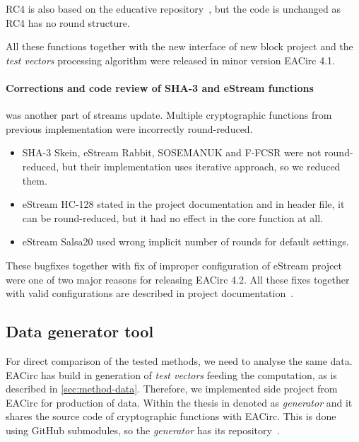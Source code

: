 \documentclass[
    digital,    %
    oneside,    %
    color,
    11pt,
    nocover,
    notable,
    nolof,
    nolot,
]{fithesis3}
\begin{document}
RC4 is also based on the educative repository~\cite{cryptoFunc}, but the code is unchanged as RC4 has no round structure.

All these functions together with the new interface of new block project and the \textit{test vectors} processing algorithm were released in minor version EACirc 4.1.

\paragraph{Corrections and code review of SHA-3 and eStream functions} was another part of streams update. Multiple cryptographic functions from previous implementation were incorrectly round-reduced.
\label{par:method-data-funcs-bugs}

\begin{itemize}
    \item SHA-3 Skein, eStream Rabbit, SOSEMANUK and F-FCSR were not round-reduced, but their implementation uses iterative approach, so we reduced them.
    \item eStream HC-128 stated in the project documentation and in header file, it can be round-reduced, but it had no effect in the core function at all.
    \item eStream Salsa20 used wrong implicit number of rounds for default settings.
\end{itemize}

These bugfixes together with fix of improper configuration of eStream project were one of two major reasons for releasing EACirc 4.2. All these fixes together with valid configurations are described in project documentation~\cite{EACirc-wiki-streams}.

\subsection{Data generator tool}
\label{subsec:method-data-generator}

For direct comparison of the tested methods, we need to analyse the same data. EACirc has build in generation of \textit{test vectors} feeding the computation, as is described in \cref{sec:method-data}. Therefore, we implemented side project from EACirc for production of data. Within the thesis in denoted as \textit{generator} and it shares the source code of cryptographic functions with EACirc. This is done using GitHub submodules, so the \textit{generator} has its repository~\cite{EACircStreams}.
\end{document}
